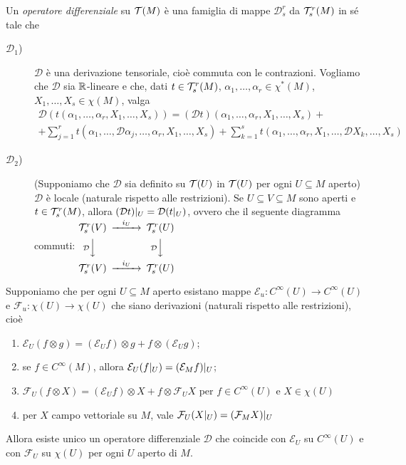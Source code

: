\begin{definition} 
	Un \emph{operatore differenziale} su $\mathcal T(M)$ è una famiglia di mappe $\mathcal D_s^r$ da $\mathcal T_s^r(M)$ in sé tale che
	\begin{description}
	 \item [$\mathcal D_1$)] $\mathcal D$ è una derivazione tensoriale, cioè commuta con le contrazioni.
	 Vogliamo che $\mathcal D$ sia $\mathbb R$-lineare e che, dati $t\in\mathcal T_s^r(M)$, $\alpha_1,\ldots,\alpha_r\in\chi^*(M)$, $X_1,\ldots,X_s\in\chi(M)$, valga
	 \begin{multline*}
	 	\mathcal D (t(\alpha_1,\ldots,\alpha_r,X_1,\ldots,X_s)) = (\mathcal D t) (\alpha_1,\ldots,\alpha_r,X_1,\ldots,X_s) +\\
	 	+\sum_{j=1}^r t(\alpha_1,\ldots,\mathcal D \alpha_j,\ldots, \alpha_r, X_1,\ldots, X_s) +
	 	\sum_{k=1}^s t(\alpha_1,\ldots, \alpha_r, X_1,\ldots, \mathcal D X_k,\ldots, X_s)
	 \end{multline*}

	\item [$\mathcal D_2$)] (Supponiamo che $\mathcal D$ sia definito su $\mathcal T(U)$ in $\mathcal T(U)$ per ogni $U\subseteq M$ aperto) $\mathcal D$ è locale (naturale rispetto alle restrizioni).
	Se $U\subseteq V \subseteq M$ sono aperti e $t\in\mathcal T_s^r(M)$, allora $(\mathcal D t)|_ U = \mathcal D (t|_ U)$, ovvero che il seguente diagramma commuti:
	$
	\begin{CD} 
	 \Tau_s^r(V) @>i_U>> \Tau_s^r(U) \\
	 @V\mathcal{D}VV  @V\mathcal{D}VV \\
	 \Tau_s^r(V) @>i_U>> \Tau_s^r(U) 
	\end{CD} $

	\end{description}
\end{definition}

\begin{theorem} \label{teo:EsistenzaOperatoriDifferenziali}
	Supponiamo che per ogni $U\subseteq M$ aperto esistano mappe $\mathcal E_u : C^\infty(U) \to C^\infty(U)$ e $\mathcal F_u : \chi(U) \to \chi(U)$ che siano derivazioni (naturali rispetto alle restrizioni), cioè
	\begin{enumerate}
		\item $\mathcal E_U(f\otimes g) = (\mathcal E_U f) \otimes g + f \otimes (\mathcal E_U g)$; \label{eod:LeibnitzPerE}
		\item se $f\in C^\infty(M)$, allora $\mathcal E_U(f|_ U) = (\mathcal E_M f)|_ U$; \label{eod:LocalitaPerE}
		\item $\mathcal F_U(f\otimes X) = (\mathcal E_U f) \otimes X + f\otimes \mathcal F_U X$ per $f\in C^\infty(U)$ e $X\in\chi(U)$ \label{eod:LeibnitzPerF}
		\item per $X$ campo vettoriale su $M$, vale $\mathcal F_U(X|_ U) = (\mathcal F_M X)|_ U$ \label{eod:LocalitaPerF}
	\end{enumerate}
	Allora esiste unico un operatore differenziale $\mathcal D$ che coincide con $\mathcal E_U$ su $C^\infty(U)$ e con $\mathcal F_U$ su $\chi(U)$ per ogni $U$ aperto di $M$.

\end{theorem}

